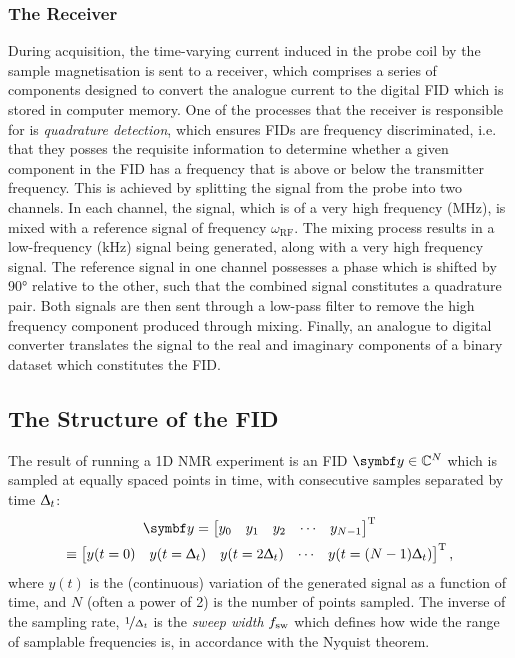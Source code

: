 \subsubsection{The Receiver}
During acquisition, the time-varying current induced in the probe coil by
the sample magnetisation is
sent to a receiver, which comprises a series of components designed to convert the
analogue current to the digital \ac{FID} which is stored in computer memory.
One of the processes that the receiver is responsible for is \emph{quadrature
detection}\cite[Section 13.6]{Keeler2010}, which ensures
\acp{FID} are frequency discriminated, i.e. that they posses the requisite
information to determine whether a given component in the \ac{FID} has a frequency
that is above or below the transmitter frequency.
This is achieved by splitting the signal from the probe into two channels. In
each channel, the signal, which is of a very high frequency
(\unit{\mega\hertz}), is mixed with a reference signal of frequency
$\omega_{\text{RF}}$. The mixing process results in a low-frequency
(\unit{\kilo\hertz}) signal being generated, along with a very high frequency
signal. The reference signal in one channel possesses a phase which
is shifted by \ang{90} relative to the other, such that the combined signal
constitutes a quadrature pair.
Both signals are then sent through a low-pass filter to remove
the high frequency component produced through mixing. Finally, an analogue to
digital converter translates the signal to the real and imaginary components of
a binary dataset which constitutes the \ac{FID}.

\subsection{The Structure of the \acs{FID}}
The result of running a \ac{1D} \ac{NMR} experiment is an \ac{FID} $\by \in
\mathbb{C}^N$ which is sampled at equally spaced points in time, with
consecutive samples separated by time $\Updelta_t$:
\begin{equation}
    \begin{gathered}
        \by = \begin{bmatrix}
            y_0 & y_1 & y_2 & \cdots & y_{N-1}
      \end{bmatrix}\T\\
      \equiv
      \begin{bmatrix}
          y(t=0) & y(t=\Dt) & y(t=2\Dt) & \cdots & y(t=(N-1)\Dt)
      \end{bmatrix}\T,
    \end{gathered}
\end{equation}
where $y(t)$ is the (continuous) variation of the generated signal as a
function of time,
and $N$ (often a power of 2) is the number of points sampled. The inverse of
the sampling rate,
$\nicefrac{1}{\Updelta_t}$ is the \emph{sweep width} $f_{\mathrm{sw}}$ which
defines how wide the range of samplable frequencies is, in accordance with the
Nyquist theorem\cite{Shannon1949}.

